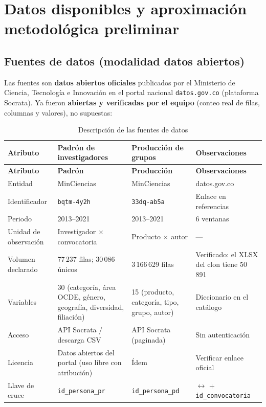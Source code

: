 \section{Datos disponibles y aproximación metodológica preliminar}

\subsection{Fuentes de datos (modalidad datos abiertos)}

Las fuentes son \textbf{datos abiertos oficiales} publicados por el Ministerio
de Ciencia, Tecnología e Innovación en el portal nacional
\texttt{datos.gov.co} (plataforma Socrata). Ya fueron \textbf{abiertas y
verificadas por el equipo} (conteo real de filas, columnas y valores), no
supuestas:

\begin{longtable}{p{2.6cm}p{4.4cm}p{4.2cm}p{2.8cm}}
\caption{Descripción de las fuentes de datos}
\label{tab:fuentes}\\
\toprule
\textbf{Atributo} & \textbf{Padrón de investigadores} & \textbf{Producción de grupos} & \textbf{Observaciones} \\
\midrule
\endfirsthead
\toprule
\textbf{Atributo} & \textbf{Padrón} & \textbf{Producción} & \textbf{Observaciones} \\
\midrule
\endhead
Entidad & MinCiencias & MinCiencias & datos.gov.co \\
Identificador & \texttt{bqtm-4y2h} & \texttt{33dq-ab5a} & Enlace en referencias \\
Periodo & 2013--2021 & 2013--2021 & 6 ventanas \\
Unidad de observación & Investigador $\times$ convocatoria & Producto $\times$ autor & — \\
Volumen declarado & 77\,237 filas; 30\,086 únicos & 3\,166\,629 filas & Verificado: el XLSX del clon tiene 50\,891 \\
Variables & 30 (categoría, área OCDE, género, geografía, diversidad, filiación) & 15 (producto, categoría, tipo, grupo, autor) & Diccionario en el catálogo \\
Acceso & API Socrata / descarga CSV & API Socrata (paginada) & Sin autenticación \\
Licencia & Datos abiertos del portal (uso libre con atribución) & Ídem & Verificar enlace oficial \\
Llave de cruce & \texttt{id\_persona\_pr} & \texttt{id\_persona\_pd} & $\leftrightarrow$ + \texttt{id\_convocatoria} \\
\bottomrule
\end{longtable}

